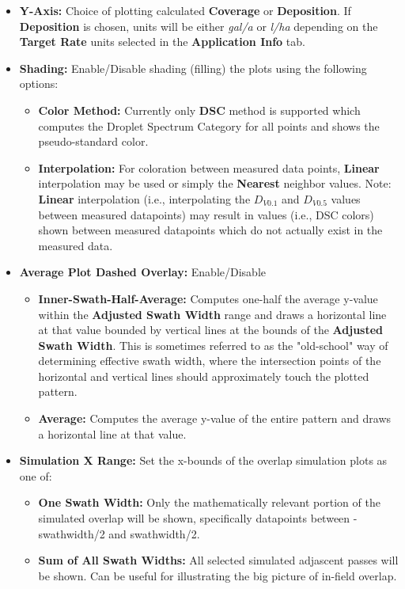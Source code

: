 \documentclass[10pt,letterpaper,titlepage]{article}
\begin{document}
    \begin{itemize}
        \item \textbf{Y-Axis:} Choice of plotting calculated \textbf{Coverage} or \textbf{Deposition}. If \textbf{Deposition} is chosen, units will be either \textit{gal/a} or \textit{l/ha} depending on the \textbf{Target Rate} units selected in the \textbf{Application Info} tab.
        \item \textbf{Shading:} Enable/Disable shading (filling) the plots using the following options:
        \begin{itemize}
            \item \textbf{Color Method:} Currently only \textbf{DSC} method is supported which computes the Droplet Spectrum Category for all points and shows the pseudo-standard color.
            \item \textbf{Interpolation:} For coloration between measured data points, \textbf{Linear} interpolation may be used or simply the \textbf{Nearest} neighbor values. \color{red}Note: \textbf{Linear} interpolation (i.e., interpolating the $D_{V0.1}$ and $D_{V0.5}$ values between measured datapoints) may result in values (i.e., DSC colors) shown between measured datapoints which do not actually exist in the measured data.\color{black}
        \end{itemize}
        \item \textbf{Average Plot Dashed Overlay:} Enable/Disable
        \begin{itemize}
            \item \textbf{Inner-Swath-Half-Average:} Computes one-half the average y-value within the \textbf{Adjusted Swath Width} range and draws a horizontal line at that value bounded by vertical lines at the bounds of the \textbf{Adjusted Swath Width}. This is sometimes referred to as the "old-school" way of determining effective swath width, where the intersection points of the horizontal and vertical lines should approximately touch the plotted pattern.
            \item \textbf{Average:} Computes the average y-value of the entire pattern and draws a horizontal line at that value.
        \end{itemize}
        \item \textbf{Simulation X Range:} Set the x-bounds of the overlap simulation plots as one of:
        \begin{itemize}
            \item \textbf{One Swath Width:} Only the mathematically relevant portion of the simulated overlap will be shown, specifically datapoints between -swathwidth/2 and swathwidth/2.
            \item \textbf{Sum of All Swath Widths:} All selected simulated adjascent passes will be shown. Can be useful for illustrating the big picture of in-field overlap.
        \end{itemize}
    \end{itemize}
\end{document}
